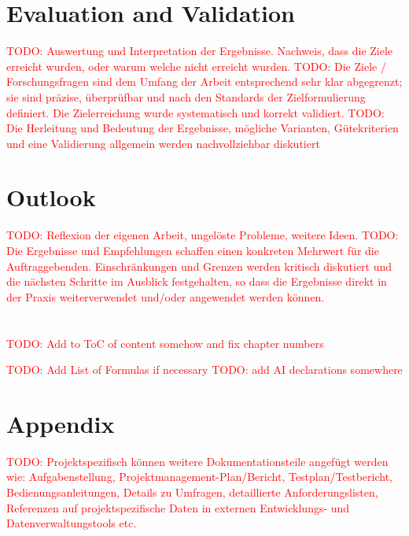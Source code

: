 \documentclass[a4paper,10.5pt,
			   bindingoffset=0.2in,left=3.35cm,right=2.12cm,top=3.75cm,bottom=2.88cm,%
				footskip=.25in
				listof=numbered,toc=chapterentrywithdots]{scrreport}
\renewcommand{\todo}[1]{\textcolor{red}{TODO: #1}}
\begin{document}
	\chapter{Evaluation and Validation}
		\todo{Auswertung und Interpretation der Ergebnisse. Nachweis, dass die Ziele erreicht wurden, oder warum	welche nicht erreicht wurden.}
		\todo{Die Ziele / Forschungsfragen sind dem Umfang der Arbeit entsprechend sehr klar abgegrenzt; sie sind präzise, überprüfbar und nach den Standards der Zielformulierung definiert. Die Zielerreichung wurde systematisch und korrekt validiert.}
		\todo{Die Herleitung und Bedeutung der Ergebnisse, mögliche Varianten, Gütekriterien und eine Validierung allgemein werden nachvollziehbar diskutiert}
	
	\chapter{Outlook}
		\todo{Reflexion der eigenen Arbeit, ungelöste Probleme, weitere Ideen.}
		\todo{Die Ergebnisse und Empfehlungen schaffen einen konkreten Mehrwert für die Auftraggebenden. Einschränkungen und Grenzen werden kritisch diskutiert und die nächsten Schritte im Ausblick festgehalten, so dass die Ergebnisse direkt in der Praxis weiterverwendet und/oder angewendet werden können.}
	
	\chapter{\glossaryname}
	\printglossary[title={}]


	\todo{Add to ToC of content somehow and fix chapter numbers}
	

	\listoffigures
	
	\listoftables
	\todo{Add List of Formulas if necessary}
	\todo{add AI declarations somewhere}
	
	
	\chapter{\bibname}
	\printbibliography[heading=none]

	
	\appendix
	\chapter{Appendix}
		\todo{Projektspezifisch können weitere Dokumentationsteile angefügt werden wie: Aufgabenstellung, Projektmanagement-Plan/Bericht, Testplan/Testbericht, Bedienungsanleitungen, Details zu Umfragen, detaillierte Anforderungslisten, Referenzen auf projektspezifische Daten in externen Entwicklungs- und Datenverwaltungstools etc.}
	
\end{document}
